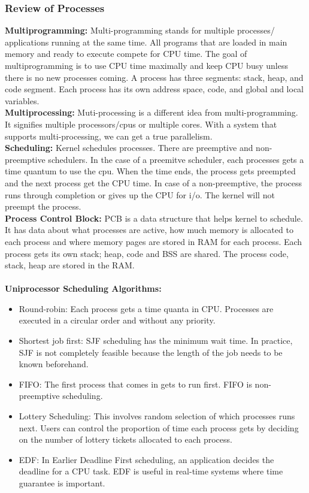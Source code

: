 \documentclass[twoside]{article}
\begin{document}
\subsubsection{Review of Processes}
\textbf{Multiprogramming:} Multi-programming stands for multiple processes/ applications running at the same time. All programs that are loaded in main memory and ready to execute compete for CPU time. The goal of multiprogramming is to use CPU time maximally and keep CPU busy unless there is no new processes coming. A process has three segments: stack, heap, and code segment. Each process has its own address space, code, and global and local variables. \\
\textbf{Multiprocessing:} Muti-processing is a different idea from multi-programming. It signifies multiple processors/cpus or multiple cores. With a system that supports multi-processing, we can get a true parallelism. \\
\textbf{Scheduling:} Kernel schedules processes. There are preemptive and non-preemptive schedulers. In the case of a preemitve scheduler, each processes gets a time quantum to use the cpu. When the time ends, the process gets preempted and the next process get the CPU time. In case of a non-preemptive, the process runs through completion or gives up the CPU for i/o. The kernel will not preempt the process.\\
\textbf{Process Control Block:} PCB is a data structure that helps kernel to schedule. It has data about what processes are active, how much memory is allocated to each process and where memory pages are stored in RAM for each process. Each process gets its own stack; heap, code and BSS are shared. The process code, stack, heap are stored in the RAM.\\ \\
\textbf{Uniprocessor Scheduling Algorithms:}
\begin{itemize}
  \item Round-robin: Each process gets a time quanta in CPU. Processes are executed in a circular order and without any priority.
  \item Shortest job first: SJF scheduling has the minimum wait time. In practice, SJF is not completely feasible because the length of the job needs to be known beforehand. 
  \item FIFO: The first process that comes in gets to run first. FIFO is non-preemptive scheduling.
   \item Lottery Scheduling: This involves random selection of which processes runs next. Users can control the proportion of time each process gets by deciding on the number of lottery tickets allocated to each process. 
   \item EDF: In Earlier Deadline First scheduling, an application decides the deadline for a CPU task. EDF is useful in real-time systems where time guarantee is important.
\end{itemize}
\end{document}

